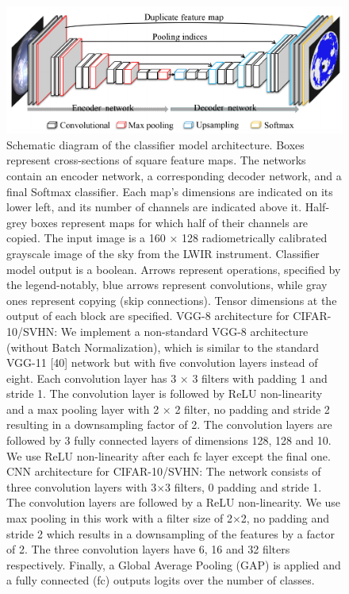 \documentclass[amt, article]{copernicus}
\begin{document}
\begin{figure}[t]
	\includegraphics[width=\hsize]{figures/schematics_segmentation_model.png}
	\caption{
		Schematic diagram of the classifier model architecture. Boxes represent cross-sections of square feature maps.  The networks contain an encoder network, a corresponding decoder network, and a final Softmax classifier. Each map's dimensions are indicated on its lower left, and its number of channels are indicated above it. Half-grey boxes represent maps for which half of their channels are copied. The input image is a 160 × 128 radiometrically calibrated grayscale image of the sky from the LWIR instrument. Classifier model output is a boolean. Arrows represent operations, specified by the legend-notably, blue arrows represent convolutions, while gray ones represent copying (skip connections). Tensor dimensions at the output of each block are specified.
        VGG-8 architecture for CIFAR-10/SVHN: We implement a non-standard VGG-8 architecture (without Batch Normalization), which is similar to the standard VGG-11 [40] network but with five convolution layers instead of eight. Each convolution layer has 3 × 3 filters with padding 1 and stride 1. The convolution layer is followed by ReLU non-linearity and a max pooling layer with 2 × 2 filter, no padding and stride 2 resulting in a downsampling factor of 2. The convolution layers are followed by 3 fully connected layers of dimensions 128, 128 and 10. We use ReLU non-linearity after each fc layer except the final one.
        CNN architecture for CIFAR-10/SVHN: The network consists of three convolution layers with 3$\times$3 filters, 0 padding and stride 1. The convolution layers are followed by a ReLU non-linearity. We use max pooling in this work with a filter size of 2$\times$2, no padding and stride 2 which results in a downsampling of the features by a factor of 2. The three convolution layers have 6, 16 and 32 filters respectively. Finally, a Global Average Pooling (GAP) is applied and a fully connected (fc) outputs logits over the number of classes.}
        \label{fig:schematics_classification_model}
\end{figure}
\end{document}

